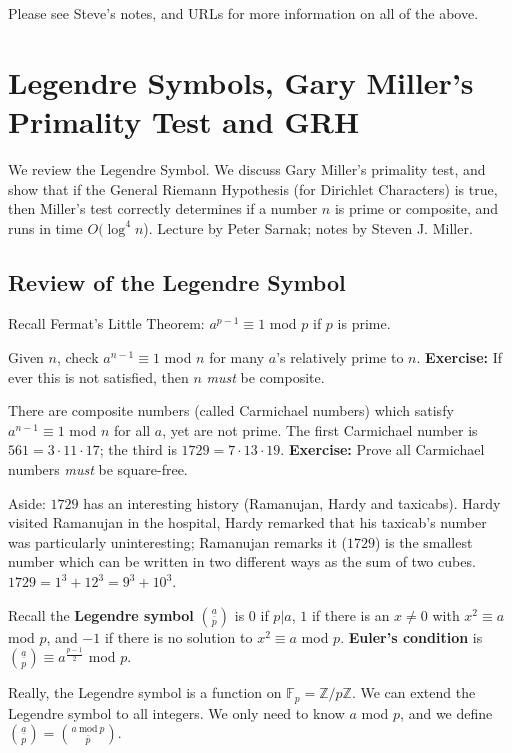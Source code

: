 \documentclass[12pt,letterpaper]{report}
\newcommand{\Z}{\ensuremath{\mathbb{Z}}}
\newcommand{\F}{\mathbb{F}}
\newcommand{\Fp}{ \F_p }
\newcommand{\js}[1]{ { \underline{#1} \choose p} }
\begin{document}
Please see Steve's notes, and URLs for more information on all of
the above.




\chapter{Legendre Symbols, Gary Miller's Primality Test and GRH}

We review the Legendre Symbol. We discuss Gary Miller's primality
test, and show that if the General Riemann Hypothesis (for
Dirichlet Characters) is true, then Miller's test correctly
determines if a number $n$ is prime or composite, and runs in time
$O(\log^4 n$). Lecture by Peter Sarnak; notes by Steven J. Miller.

\section{Review of the Legendre Symbol}

Recall Fermat's Little Theorem: $a^{p-1} \equiv 1$ mod $p$ if $p$
is prime.

Given $n$, check $a^{n-1} \equiv 1$ mod $n$ for many $a$'s
relatively prime to $n$. \textbf{Exercise:} If ever this is not
satisfied, then $n$ \emph{must} be composite.

There are composite numbers (called Carmichael numbers) which
satisfy $a^{n-1} \equiv 1$ mod $n$ for all $a$, yet are not prime.
The first Carmichael number is $561 = 3 \cdot 11 \cdot 17$; the
third is $1729 = 7 \cdot 13 \cdot 19$. \textbf{Exercise:} Prove
all Carmichael numbers \emph{must} be square-free.

Aside: $1729$ has an interesting history (Ramanujan, Hardy and
taxicabs). Hardy visited Ramanujan in the hospital, Hardy remarked
that his taxicab's number was particularly uninteresting;
Ramanujan remarks it ($1729$) is the smallest number which can be
written in two different ways as the sum of two cubes. $1729 = 1^3
+ 12^3 = 9^3 + 10^3$.

Recall the \textbf{Legendre symbol} $\js{a}$ is $0$ if $p|a$, $1$
if there is an $x \neq 0$ with $x^2 \equiv a$ mod $p$, and $-1$ if
there is no solution to $x^2 \equiv a$ mod $p$. \textbf{Euler's
condition} is $\js{a} \equiv a^{\frac{p-1}{2}}$ mod $p$.

Really, the Legendre symbol is a function on $\Fp = \Z / p\Z$. We
can extend the Legendre symbol to all integers. We only need to
know $a$ mod $p$, and we define $\js{a} = \js{a \ \mbox{mod} \
p}$.
\end{document}
